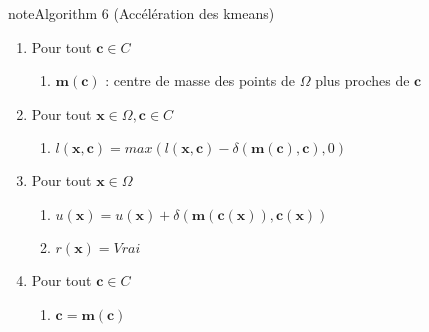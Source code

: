 \documentclass[letterpaper,10pt,french]{sphinxmanual}
\begin{document}
\begin{sphinxadmonition}{note}{Algorithm 6 (Accélération des k\sphinxhyphen{}means)}
\begin{enumerate}
\begin{enumerate}
\begin{enumerate}
\begin{enumerate}
\item {} 
\sphinxAtStartPar
Si \(\delta(\mathbf x,\mathbf c)<\delta(\mathbf c(\mathbf x),\mathbf x)\)
\begin{enumerate}
%
\item {} 
\sphinxAtStartPar
\(\mathbf c(\mathbf x)= \mathbf c\)

\end{enumerate}

\end{enumerate}

\end{enumerate}

\item {} 
\sphinxAtStartPar
Pour tout \(\mathbf c\in C\)
\begin{enumerate}
%
\item {} 
\sphinxAtStartPar
\(\mathbf m(\mathbf c)\) : centre de masse des points de \(\Omega\) plus proches de \(\mathbf c\)

\end{enumerate}

\item {} 
\sphinxAtStartPar
Pour tout \(\mathbf x\in \Omega,\mathbf c\in C\)
\begin{enumerate}
%
\item {} 
\sphinxAtStartPar
\(l(\mathbf x,\mathbf c)=max\left (l(\mathbf x,\mathbf c)-\delta(\mathbf m(\mathbf c),\mathbf c),0 \right )\)

\end{enumerate}

\item {} 
\sphinxAtStartPar
Pour tout \(\mathbf x\in \Omega\)
\begin{enumerate}
%
\item {} 
\sphinxAtStartPar
\(u(\mathbf x)=u(\mathbf x)+\delta(\mathbf m(\mathbf c(\mathbf x)),\mathbf c(\mathbf x))\)

\item {} 
\sphinxAtStartPar
\(r(\mathbf x)=Vrai\)

\end{enumerate}

\item {} 
\sphinxAtStartPar
Pour tout \(\mathbf c\in C\)
\begin{enumerate}
%
\item {} 
\sphinxAtStartPar
\(\mathbf c = \mathbf m(\mathbf c)\)

\end{enumerate}

\end{enumerate}

\end{enumerate}
\end{sphinxadmonition}
\end{document}
